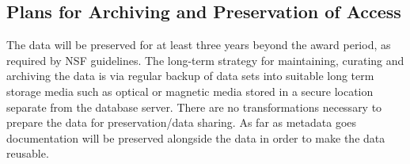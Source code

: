 \subsection*{Plans for Archiving and Preservation of Access}
The data will be preserved for at least three years beyond the award period, as required by NSF guidelines. The long-term strategy for maintaining, curating and archiving the data is via regular backup of data sets into suitable long term storage media such as optical or magnetic media stored in a secure location separate from the database server. There are no transformations necessary to prepare the data for preservation/data sharing. As far as metadata goes documentation will be preserved alongside the data in order to make the data reusable.

